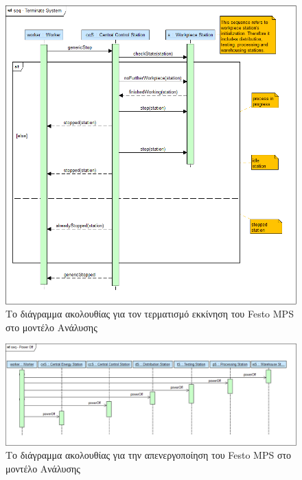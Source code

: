 \documentclass[a4paper,12pt,twoside]{report}
\begin{document}
\begin{appendices}
			\begin{figure}[hp]
					\centering
					\includegraphics[scale=0.30]{AnalysisModel_seq-TerminateSystem.png}
					\caption{Το διάγραμμα ακολουθίας για τον τερματισμό εκκίνηση του Festo MPS στο μοντέλο Ανάλυσης}
					\label{φωτ:Το διάγραμμα ακολουθίας για τον τερματισμό του Festo MPS στο μοντέλο Ανάλυσης}
			\end{figure}
			
			\begin{figure}[hp]
					\centering
					\includegraphics[scale=0.30]{AnalysisModel_seq-PowerOff.png}
					\caption{Το διάγραμμα ακολουθίας για την απενεργοποίηση του Festo MPS στο μοντέλο Ανάλυσης}
					\label{φωτ:Το διάγραμμα ακολουθίας για την απενεργοποίηση του Festo MPS στο μοντέλο Ανάλυσης}
			\end{figure}
			

\end{appendices}
\end{document}
